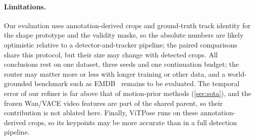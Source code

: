 \paragraph{Limitations.}
Our evaluation uses annotation-derived crops and ground-truth track identity for the shape prototype and the validity masks, so the absolute numbers are likely optimistic relative to a detector-and-tracker pipeline; the paired comparisons share this protocol, but their size may change with detected crops.
All conclusions rest on one dataset, three seeds and one continuation budget; the router may matter more or less with longer training or other data, and a world-grounded benchmark such as EMDB~\cite{kaufmann2023emdb} remains to be evaluated.
The temporal error of our refiner is far above that of motion-prior methods (\cref{sec:sota}), and the frozen Wan/VACE video features are part of the shared parent, so their contribution is not ablated here.
Finally, ViTPose runs on these annotation-derived crops, so its keypoints may be more accurate than in a full detection pipeline.
